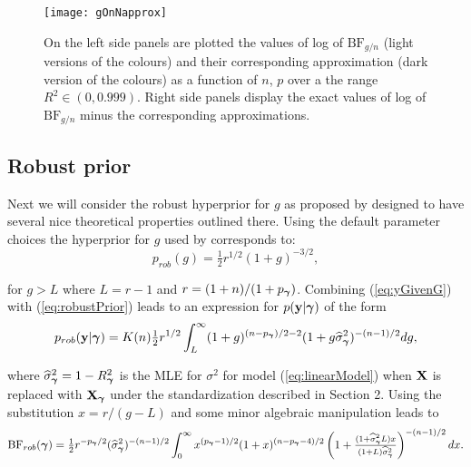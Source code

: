 \begin{figure}
	\centering
	\texttt{[image: gOnNapprox]}
	\caption{On the left side panels are plotted the values of log of $\mbox{BF}_{g/n}$ (light versions of the
		colours) and their corresponding approximation (dark version of the colours) 
		as a function of $n$, $p$ over a the range $R^2\in(0,0.999)$. Right side panels display
		the exact values of log of $\mbox{BF}_{g/n}$ minus the corresponding approximations.}
	\label{fig:gonnapprox}
\end{figure}


\subsection{Robust prior}  

\noindent
Next we will consider the robust hyperprior for $g$ as proposed by \cite{Bayarri2012} designed to have several nice theoretical
properties outlined there. Using the default parameter
choices the hyperprior 
for $g$ used by \cite{Bayarri2012} corresponds to:
\begin{equation}\label{eq:robustPrior}
	p_{{rob}}(g) = \tfrac{1}{2}r^{1/2} (1 + g)^{-3/2},
\end{equation}

\noindent for $g>L$  where $L = r - 1$ and $r = (1 + n)/(1 + p_{\boldsymbol \gamma})$. 
Combining (\ref{eq:yGivenG}) with (\ref{eq:robustPrior})
leads to an expression for $p({\bf y}|{\boldsymbol \gamma})$ of the form
\begin{equation}\label{eq:marginalLikelihoodRobust}
	\displaystyle p_{rob}({\bf y}|{\boldsymbol \gamma})
	\displaystyle = K(n) \tfrac{1}{2} r^{1/2} 
	\int_L^\infty  (1 + g)^{(n - p_{\boldsymbol \gamma})/2 - 2}(  1 + g \widehat{\sigma}_{\boldsymbol \gamma}^2)^{-(n-1)/2} dg,
\end{equation}

\noindent where $\widehat{\sigma}_{\boldsymbol \gamma}^2 = 1 - R_{\boldsymbol \gamma}^2$ is the MLE
for $\sigma^2$ for model (\ref{eq:linearModel}) when ${\bf X}$ is replaced with ${\bf X}_{\boldsymbol \gamma}$ under the standardization described in Section 2.
Using the substitution 
$x = r/(g - L)$ and some minor algebraic
manipulation leads to
%
$$
\displaystyle \mbox{BF}_{{rob}}({\boldsymbol \gamma})
\displaystyle = \tfrac{1}{2} r^{ - p_{\boldsymbol \gamma}/2} (\widehat{\sigma}_{\boldsymbol \gamma}^2)^{-(n-1)/2}
\int_0^\infty x^{(p_{\boldsymbol \gamma}-1)/2} 
(1 + x)^{(n - p_{\boldsymbol \gamma} - 4)/2}
\left( 1 + \tfrac{(1 + \widehat{\sigma}_{\boldsymbol \gamma}^2 L)x}{(1 + L)\widehat{\sigma}_{\boldsymbol \gamma}^2}  \right)^{-(n-1)/2}  dx.
$$



